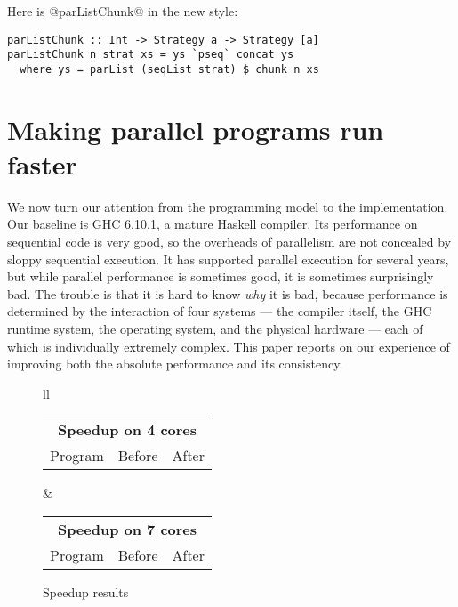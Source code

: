 \documentclass[twocolumn,9pt]{sigplanconf}
\begin{document}
Here is @parListChunk@ in the new style:
\begin{verbatim}
parListChunk :: Int -> Strategy a -> Strategy [a]
parListChunk n strat xs = ys `pseq` concat ys
  where ys = parList (seqList strat) $ chunk n xs
\end{verbatim}





\section{Making parallel programs run faster}

We now turn our attention from the programming model to the
implementation.  Our baseline is GHC 6.10.1, a mature Haskell
compiler.  Its performance on sequential code is very good, so the
overheads of parallelism are not concealed by sloppy sequential
execution.  It has supported parallel execution for several years, but
while parallel performance is sometimes good, it is sometimes
surprisingly bad.  The trouble is that it is hard to know \emph{why} it is
bad, because performance is determined by the interaction of four systems ---
the compiler itself, the GHC runtime system, the operating system, and the physical
hardware --- each of which is individually extremely complex.
This paper reports on our experience of improving both the absolute
performance and its consistency.

\begin{figure}
\hspace{-2ex}
\begin{tabular}{ll}
\begin{tabular}{lrr}
\hline
\multicolumn{3}{c}{\textbf{Speedup on 4 cores}} \\
Program & Before & After \\
\hline

\end{tabular}
&
\begin{tabular}{lrr}
\hline
\multicolumn{3}{c}{\textbf{Speedup on 7 cores}} \\
Program & Before & After \\
\hline

\end{tabular}
\end{tabular}

\caption{Speedup results}
\label{f:speedup}
\end{figure}
\end{document}
